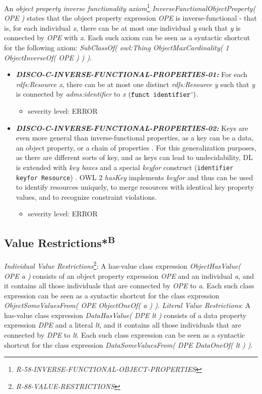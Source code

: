 \documentclass{llncs}
\newcommand{\ms}[1]{\texttt{#1}}
\begin{document}
An \emph{object property inverse functionality axiom}\footnote{\emph{R-58-INVERSE-FUNCTIONAL-OBJECT-PROPERTIES}} \emph{InverseFunctionalObjectProperty( OPE )} states that the object property expression \emph{OPE} is inverse-functional - that is, for each individual \emph{x}, there can be at most one individual \emph{y} such that \emph{y} is connected by \emph{OPE} with \emph{x}. Each such axiom can be seen as a syntactic shortcut for the following axiom: \emph{SubClassOf( owl:Thing ObjectMaxCardinality( 1 ObjectInverseOf( OPE ) ) )}.

\begin{itemize}
	\item \textbf{{\em DISCO-C-INVERSE-FUNCTIONAL-PROPERTIES-01:}}
	For each \emph{rdfs:Resource x}, there can be at most one distinct \emph{rdfs:Resource y} such that \emph{y} is connected by \emph{adms:identifier} to \emph{x} $(\ms{funct identifier}\sp{\overline{\ }})$.
	\begin{itemize}
		\item severity level: ERROR
	\end{itemize}
	\item \textbf{{\em DISCO-C-INVERSE-FUNCTIONAL-PROPERTIES-02:}}
	Keys are even more general than inverse-functional properties,
as a key can be a data, an object property, or a chain of properties \cite{Schneider2009}.
For this generalization purposes, as there are different sorts of key, and as keys can lead to undecidability, 
DL is extended with \emph{key boxes} and a special \emph{keyfor} construct (\ms{identifier \ms{keyfor} Resource}) \cite{Lutz2005}.
OWL 2 \emph{hasKey} implements \emph{keyfor} and thus can be used to identify resources uniquely, to merge resources with identical key property values, and to recognize constraint violations.
	\begin{itemize}
		\item severity level: ERROR
	\end{itemize}
\end{itemize}

\subsection{Value Restrictions*\textsuperscript{B}}

\emph{Individual Value Restrictions}\footnote{\emph{R-88-VALUE-RESTRICTIONS}}: A has-value class expression \emph{ObjectHasValue( OPE a )} consists of an object property expression \emph{OPE} and an individual \emph{a}, and it contains all those individuals that are connected by \emph{OPE} to \emph{a}. Each such class expression can be seen as a syntactic shortcut for the class expression \emph{ObjectSomeValuesFrom( OPE ObjectOneOf( a ) )}. 
\emph{Literal Value Restrictions}: A has-value class expression \emph{DataHasValue( DPE lt )} consists of a data property expression \emph{DPE} and a literal \emph{lt}, and it contains all those individuals that are connected by \emph{DPE} to \emph{lt}. Each such class expression can be seen as a syntactic shortcut for the class expression \emph{DataSomeValuesFrom( DPE DataOneOf( lt ) )}.
\end{document}
